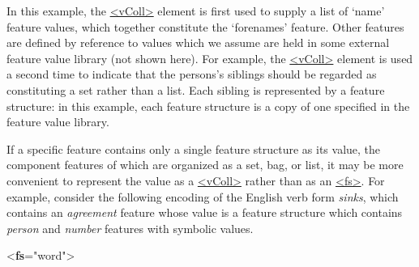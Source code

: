 In this example, the \hyperref[TEI.vColl]{<vColl>} element is first used to supply a list of ‘name’ feature values, which together constitute the ‘forenames’ feature. Other features are defined by reference to values which we assume are held in some external feature value library (not shown here). For example, the \hyperref[TEI.vColl]{<vColl>} element is used a second time to indicate that the persons's siblings should be regarded as constituting a set rather than a list. Each sibling is represented by a feature structure: in this example, each feature structure is a copy of one specified in the feature value library.\par
If a specific feature contains only a single feature structure as its value, the component features of which are organized as a set, bag, or list, it may be more convenient to represent the value as a \hyperref[TEI.vColl]{<vColl>} rather than as an \hyperref[TEI.fs]{<fs>}. For example, consider the following encoding of the English verb form \textit{sinks}, which contains an \textit{agreement} feature whose value is a feature structure which contains \textit{person} and \textit{number} features with symbolic values. \par\bgroup{}\exampleFont \begin{shaded}\noindent\mbox{}{<\textbf{fs}\hspace*{1em}{type}="{word}">}\mbox{}\newline 
{}\mbox{}\newline 
\hspace*{1em}\mbox{}\newline 

\end{shaded}
